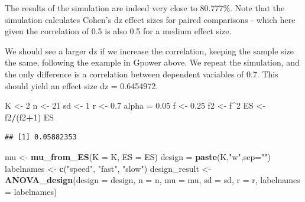 \documentclass[]{book}
\newenvironment{Shaded}{\begin{snugshade}}{\end{snugshade}}
\newcommand{\DataTypeTok}[1]{\textcolor[rgb]{0.13,0.29,0.53}{#1}}
\newcommand{\DecValTok}[1]{\textcolor[rgb]{0.00,0.00,0.81}{#1}}
\newcommand{\FloatTok}[1]{\textcolor[rgb]{0.00,0.00,0.81}{#1}}
\newcommand{\KeywordTok}[1]{\textcolor[rgb]{0.13,0.29,0.53}{\textbf{#1}}}
\newcommand{\NormalTok}[1]{#1}
\newcommand{\OperatorTok}[1]{\textcolor[rgb]{0.81,0.36,0.00}{\textbf{#1}}}
\newcommand{\StringTok}[1]{\textcolor[rgb]{0.31,0.60,0.02}{#1}}
\begin{document}
The results of the simulation are indeed very close to 80.777\%. Note that the simulation calculates Cohen's dz effect sizes for paired comparisons - which here given the correlation of 0.5 is also 0.5 for a medium effect size.

We should see a larger dz if we increase the correlation, keeping the sample size the same, following the example in Gpower above. We repeat the simulation, and the only difference is a correlation between dependent variables of 0.7. This should yield an effect size dz = 0.6454972.

\begin{Shaded}
\begin{Highlighting}[]
\NormalTok{K <-}\StringTok{ }\DecValTok{2}
\NormalTok{n <-}\StringTok{ }\DecValTok{21}
\NormalTok{sd <-}\StringTok{ }\DecValTok{1}
\NormalTok{r <-}\StringTok{ }\FloatTok{0.7}
\NormalTok{alpha =}\StringTok{ }\FloatTok{0.05}
\NormalTok{f <-}\StringTok{ }\FloatTok{0.25}
\NormalTok{f2 <-}\StringTok{ }\NormalTok{f}\OperatorTok{^}\DecValTok{2}
\NormalTok{ES <-}\StringTok{ }\NormalTok{f2}\OperatorTok{/}\NormalTok{(f2}\OperatorTok{+}\DecValTok{1}\NormalTok{)}
\NormalTok{ES}
\end{Highlighting}
\end{Shaded}

\begin{verbatim}
## [1] 0.05882353
\end{verbatim}

\begin{Shaded}
\begin{Highlighting}[]
\NormalTok{mu <-}\StringTok{ }\KeywordTok{mu_from_ES}\NormalTok{(}\DataTypeTok{K =}\NormalTok{ K, }\DataTypeTok{ES =}\NormalTok{ ES)}
\NormalTok{design =}\StringTok{ }\KeywordTok{paste}\NormalTok{(K,}\StringTok{"w"}\NormalTok{,}\DataTypeTok{sep=}\StringTok{""}\NormalTok{)}
\NormalTok{labelnames <-}\StringTok{ }\KeywordTok{c}\NormalTok{(}\StringTok{"speed"}\NormalTok{, }\StringTok{"fast"}\NormalTok{, }\StringTok{"slow"}\NormalTok{)}
\NormalTok{design_result <-}\StringTok{ }\KeywordTok{ANOVA_design}\NormalTok{(}\DataTypeTok{design =}\NormalTok{ design,}
                   \DataTypeTok{n =}\NormalTok{ n, }
                   \DataTypeTok{mu =}\NormalTok{ mu, }
                   \DataTypeTok{sd =}\NormalTok{ sd, }
                   \DataTypeTok{r =}\NormalTok{ r, }
                   \DataTypeTok{labelnames =}\NormalTok{ labelnames)}
\end{Highlighting}
\end{Shaded}
\end{document}
